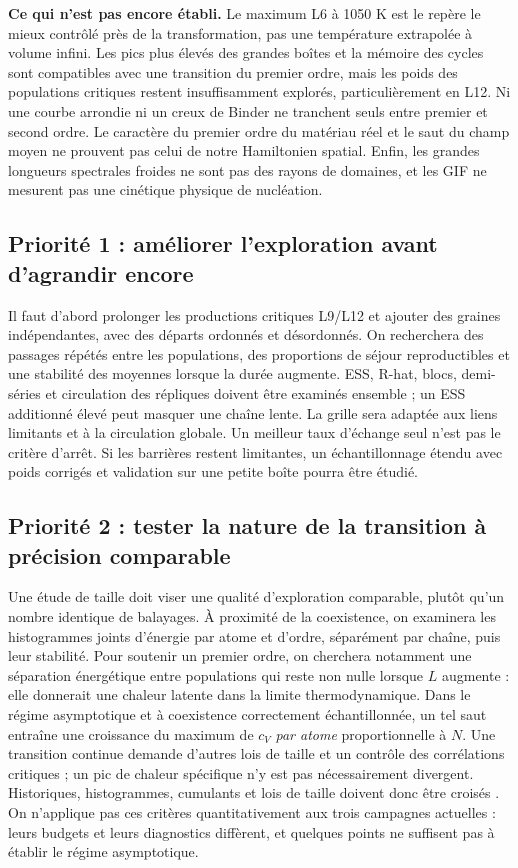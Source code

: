 \documentclass[10pt,a4paper]{article}
\begin{document}
\textbf{Ce qui n'est pas encore établi.} Le maximum L6 à 1050 K est
le repère le mieux contrôlé près de la transformation, pas une température
extrapolée à volume infini. Les pics plus élevés des grandes boîtes et
la mémoire des cycles sont compatibles avec une transition du premier
ordre, mais les poids des populations critiques restent insuffisamment
explorés, particulièrement en L12. Ni une courbe arrondie ni un creux
de Binder ne tranchent seuls entre premier et second ordre. Le caractère
du premier ordre du matériau réel et le saut du champ moyen ne prouvent
pas celui de notre Hamiltonien spatial. Enfin, les grandes longueurs
spectrales froides ne sont pas des rayons de domaines, et les GIF ne
mesurent pas une cinétique physique de nucléation.

\subsection*{Priorité 1 : améliorer l'exploration avant d'agrandir encore}
Il faut d'abord prolonger les productions critiques L9/L12 et ajouter
des graines indépendantes, avec des départs ordonnés et désordonnés.
On recherchera des passages répétés entre les populations, des proportions
de séjour reproductibles et une stabilité des moyennes lorsque la durée
augmente. ESS, R-hat, blocs, demi-séries et circulation des répliques
doivent être examinés ensemble ; un ESS additionné élevé peut masquer
une chaîne lente. La grille sera adaptée aux liens limitants et à la
circulation globale. Un meilleur taux d'échange seul n'est pas le critère
d'arrêt. Si les barrières restent limitantes, un échantillonnage étendu
avec poids corrigés et validation sur une petite boîte pourra être étudié.

\subsection*{Priorité 2 : tester la nature de la transition à précision comparable}
Une étude de taille doit viser une qualité d'exploration comparable,
plutôt qu'un nombre identique de balayages. À proximité de la coexistence,
on examinera les histogrammes joints d'énergie par atome et d'ordre,
séparément par chaîne, puis leur stabilité. Pour soutenir un premier
ordre, on cherchera notamment une séparation énergétique entre populations
qui reste non nulle lorsque $L$ augmente : elle donnerait une chaleur
latente dans la limite thermodynamique. Dans le régime asymptotique et
à coexistence correctement échantillonnée, un tel saut entraîne une
croissance du maximum de $c_V$ \emph{par atome} proportionnelle à $N$.
Une transition continue demande d'autres lois de taille et un contrôle
des corrélations critiques ; un pic de chaleur spécifique n'y est pas
nécessairement divergent. Historiques, histogrammes, cumulants et
lois de taille doivent donc être croisés \cite{challa}.
On n'applique pas ces critères quantitativement aux trois campagnes
actuelles : leurs budgets et leurs diagnostics diffèrent, et quelques
points ne suffisent pas à établir le régime asymptotique.
\end{document}

